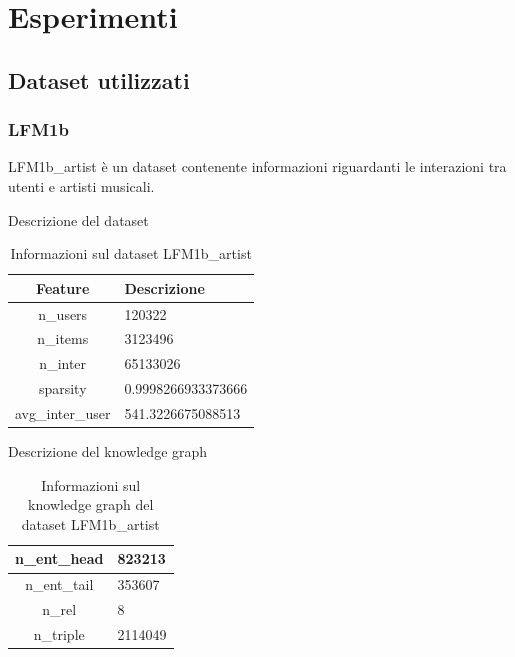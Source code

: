 \section{Esperimenti}

\subsection{Dataset utilizzati}
\subsubsection{LFM1b}


LFM1b\_artist è un dataset contenente informazioni riguardanti le interazioni tra utenti e artisti musicali.

\noindent Descrizione del dataset
\begin{table}[H]
    \centering
    \footnotesize
    \begin{tabularx}{\textwidth}{|c|X|}
        \hline
        \textbf{Feature} & \textbf{Descrizione} \\
        \hline
        n\_users & 120322 \\
        \hline
        n\_items & 3123496 \\
        \hline
        n\_inter & 65133026 \\
        \hline
        sparsity & 0.9998266933373666 \\
        \hline
        avg\_inter\_user & 541.3226675088513 \\
        \hline
    \end{tabularx}
    \caption{Informazioni sul dataset LFM1b\_artist}
    \label{tab:dataset_info}
\end{table}


\noindent Descrizione del knowledge graph
\begin{table}[H]
    \centering
    \footnotesize
    \begin{tabularx}{\textwidth}{|c|X|}
        \hline
        n\_ent\_head & 823213 \\
        \hline
        n\_ent\_tail & 353607 \\
        \hline
        n\_rel & 8 \\
        \hline
        n\_triple & 2114049 \\
        \hline
    \end{tabularx}
    \caption{Informazioni sul knowledge graph del dataset LFM1b\_artist}
    \label{tab:dataset_info}
\end{table}




